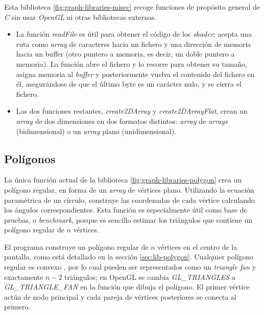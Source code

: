 Esta biblioteca \ref{fig:graph-libraries-miscc} recoge funciones de propósito general de \textit{C} sin usar \textit{OpenGL} ni otras bibliotecas externas.

\begin{itemize}

    \item La función \textit{readFile} es útil para obtener el código de los \textit{shader}; acepta una ruta como \textit{array} de caracteres hacia un fichero y una dirección de memoria hacia un buffer (otro puntero a memoria, es decir, un doble puntero a memoria). La función abre el fichero y lo recorre para obtener su tamaño, asigna memoria al \textit{buffer} y posteriormente vuelva el contenido del fichero en él, asegurándose de que el último byte es un carácter nulo, y se cierra el fichero.

    \item Las dos funciones restantes, \textit{create2DArray} y \textit{create2DArrayFlat}, crean un \textit{array} de dos dimensiones en dos formatos distintos: \textit{array} de \textit{arrays} (bidimensional) o un \textit{array} plano (unidimensional).

\end{itemize}

\subsection{Polígonos}

La única función actual de la biblioteca \ref{fig:graph-libraries-polygon} crea un polígono regular, en forma de un \textit{array} de vértices plano. Utilizando la ecuación paramétrica de un círculo, construye las coordenadas de cada vértice calculando los ángulos correspondientes. Esta función es especialmente útil como base de pruebas, o \textit{benchmark}, porque es sencillo estimar los triángulos que contiene un polígono regular de $n$ vértices.

El programa construye un polígono regular de $n$ vértices en el centro de la pantalla, como está detallado en la sección \ref{sec:lib-polygon}. Cualquier polígono regular es convexo \cite{webWolframConvexPolygon}, por lo cual pueden ser representados como un \textit{triangle fan} \cite[Capítulo~3]{bookOGLGuideKhronos9} y exactamente $n-2$ triángulos; en OpenGL se cambia \textit{GL\_TRIANGLES} a \textit{GL\_TRIANGLE\_FAN} en la función que dibuja el polígono. El primer vértice actúa de nodo principal y cada pareja de vértices posteriores se conecta al primero.

